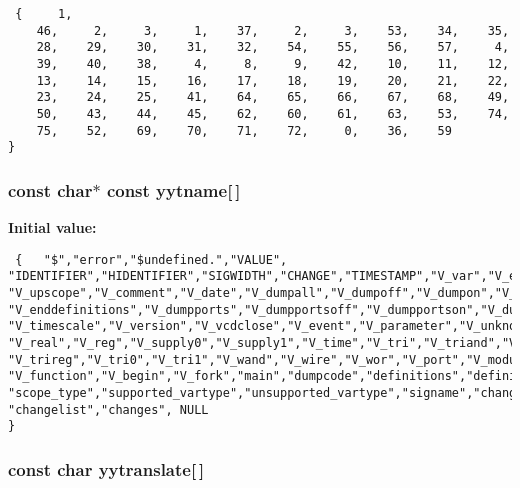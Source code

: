 \footnotesize\begin{verbatim} {     1,
    46,     2,     3,     1,    37,     2,     3,    53,    34,    35,
    28,    29,    30,    31,    32,    54,    55,    56,    57,     4,
    39,    40,    38,     4,     8,     9,    42,    10,    11,    12,
    13,    14,    15,    16,    17,    18,    19,    20,    21,    22,
    23,    24,    25,    41,    64,    65,    66,    67,    68,    49,
    50,    43,    44,    45,    62,    60,    61,    63,    53,    74,
    75,    52,    69,    70,    71,    72,     0,    36,    59
}\end{verbatim}\normalsize 
{}
\subsubsection{\setlength{\rightskip}{0pt plus 5cm}const char$\ast$ const yytname[$\,$]\hspace{0.3cm}{\tt  [static]}}\label{vcd__parser_8c_a87}


{\bf Initial value:}

\footnotesize\begin{verbatim} {   "$","error","$undefined.","VALUE",
"IDENTIFIER","HIDENTIFIER","SIGWIDTH","CHANGE","TIMESTAMP","V_var","V_end","V_scope",
"V_upscope","V_comment","V_date","V_dumpall","V_dumpoff","V_dumpon","V_dumpvars",
"V_enddefinitions","V_dumpports","V_dumpportsoff","V_dumpportson","V_dumpportsall",
"V_timescale","V_version","V_vcdclose","V_event","V_parameter","V_unknown","V_integer",
"V_real","V_reg","V_supply0","V_supply1","V_time","V_tri","V_triand","V_trior",
"V_trireg","V_tri0","V_tri1","V_wand","V_wire","V_wor","V_port","V_module","V_task",
"V_function","V_begin","V_fork","main","dumpcode","definitions","definition",
"scope_type","supported_vartype","unsupported_vartype","signame","changelists",
"changelist","changes", NULL
}\end{verbatim}\normalsize 
{}
\subsubsection{\setlength{\rightskip}{0pt plus 5cm}const char yytranslate[$\,$]\hspace{0.3cm}{\tt  [static]}}\label{vcd__parser_8c_a83}


